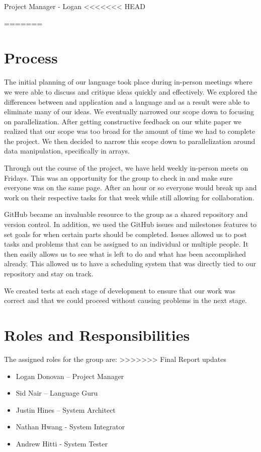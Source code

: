 Project Manager - Logan
<<<<<<< HEAD
\label{sec:project_plan}

=======

\section{Process}
The initial planning of our language took place during in-person meetings where we were able to discuss and critique ideas quickly and effectively. We explored the differences between and application and a language and as a result were able to eliminate many of our ideas. We eventually narrowed our scope down to focusing on parallelization. After getting constructive feedback on our white paper we realized that our scope was too broad for the amount of time we had to complete the project. We then decided to narrow this scope down to parallelization around data manipulation, specifically in arrays. 

Through out the course of the project, we have held weekly in-person meets on Fridays. This was an opportunity for the group to check in and make sure everyone was on the same page. After an hour or so everyone would break up and work on their respective tasks for that week while still allowing for collaboration. 

GitHub became an invaluable resource to the group as a shared repository and version control. In addition, we used the GitHub issues and milestones features to set goals for when certain parts should be completed.  Issues allowed us to post tasks and problems that can be assigned to an individual or multiple people. It then easily allows us to see what is left to do and what has been accomplished already. This allowed us to have a scheduling system that was directly tied to our repository and stay on track.

We created tests at each stage of development to ensure that our work was correct and that we could proceed without causing problems in the next stage.

\section{Roles and Responsibilities}
The assigned roles for the group are:
>>>>>>> Final Report updates
\begin{itemize}
\item Logan Donovan – Project Manager
\item Sid Nair – Language Guru
\item Justin Hines – System Architect
\item Nathan Hwang - System Integrator
\item Andrew Hitti	- System Tester
\end{itemize}

